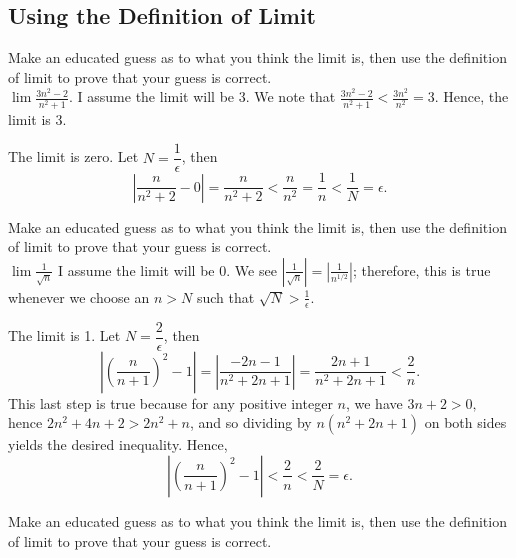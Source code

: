 \documentclass[12pt]{book}
\newenvironment{exercise}[2][Exercise]{\begin{trivlist}
\item[\hskip \labelsep {\bfseries #1}\hskip \labelsep {\bfseries #2.}]}{\end{trivlist}}
\begin{document}
\begin{exercise}{1.4.6}
\section{Using the Definition of Limit}


\begin{exercise}{2.2.1}
Make an educated guess as to what you think the limit is, then use the definition of limit to prove that your guess is correct.\\

$\lim \frac{3n^2 -2}{n^2 +1}$. I assume the limit will be $3$. We note that $\frac{3n^2 - 2}{n^2+1} <  \frac{3n^2}{n^2} = 3$. Hence, the limit is 3.
\end{exercise}

\begin{exercise}{2.2.2}
The limit is zero. Let $N = \dfrac{1}{\epsilon}$, then $$\left| \dfrac{n}{n^2 + 2} - 0 \right| = \dfrac{n}{n^2+2} < \dfrac{n}{n^2} = \dfrac{1}{n} < \dfrac{1}{N} = \epsilon.$$
\end{exercise}

\begin{exercise}{2.2.3}
Make an educated guess as to what you think the limit is, then use the definition of limit to prove that your guess is correct.\\

$\lim \frac{1}{\sqrt{n}} $ I assume the limit will be $0$. We see $| \frac{1}{\sqrt{n}}| = | \frac{1}{n^{1/2}}|$; therefore, this is true whenever we choose an $n>N$ such that $\sqrt{N}> \frac{1}{\epsilon}$.
\end{exercise}

\begin{exercise}{2.2.4}
The limit is 1. Let $N = \dfrac{2}{\epsilon}$, then $$\left| \left(\dfrac{n}{n+1}\right)^2 - 1 \right| = \left| \dfrac{-2n-1}{n^2 + 2n + 1} \right| = \dfrac{2n+1}{n^2 + 2n + 1}< \dfrac{2}{n}.$$ This last step is true because for any positive integer $n$, we have $3n+2 > 0,$ hence $2n^2 + 4n + 2 > 2n^2 + n$, and so dividing by $n(n^2 + 2n + 1)$ on both sides yields the desired inequality. Hence, $$\left| \left(\dfrac{n}{n+1}\right)^2 - 1 \right| < \dfrac{2}{n} < \dfrac{2}{N} = \epsilon.$$
\end{exercise}


\begin{exercise}{2.2.5}
Make an educated guess as to what you think the limit is, then use the definition of limit to prove that your guess is correct.\\


\end{exercise}
\end{exercise}
\end{document}
